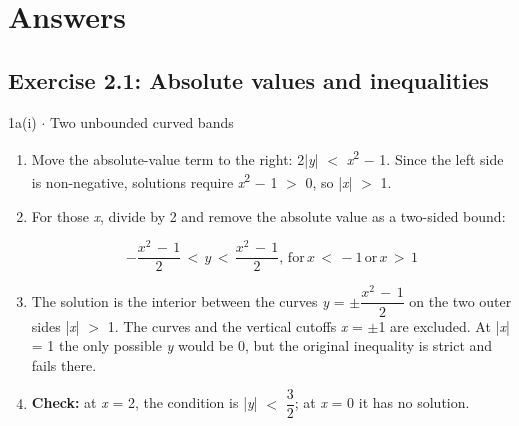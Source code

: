 \documentclass[11pt]{article}
\begin{document}
\clearpage
\section{Answers}
\begin{keepsection}\subsection{Exercise 2.1: Absolute values and inequalities}

\begin{workedbox}{1a(i) \ensuremath{\cdot} Two unbounded curved bands}
\begin{enumerate}
\item Move the absolute-value term to the right: 2|\textit{y}| \ensuremath{<} \textit{x}\textsuperscript{2} \ensuremath{-} 1. Since the left side is non-negative, solutions require \textit{x}\textsuperscript{2} \ensuremath{-} 1 \ensuremath{>} 0, so |\textit{x}| \ensuremath{>} 1.
\item {}
For those \textit{x}, divide by 2 and remove the absolute value as a two-sided bound:

\begin{equation*}-\dfrac{{x}^{2}\, -\, 1}{2}\, <\, {y}\, <\, \dfrac{{x}^{2}\, -\, 1}{2},\, \text{for}\, {x}\, <\, -1\, \text{or}\, {x}\, >\, 1\end{equation*}
\item The solution is the interior between the curves \textit{y} = \ensuremath{\pm}{\small\ensuremath{\dfrac{{x}^{2}\, -\, 1}{2}}} on the two outer sides |\textit{x}| \ensuremath{>} 1. The curves and the vertical cutoffs \textit{x} = \ensuremath{\pm}1 are excluded. At |\textit{x}| = 1 the only possible \textit{y} would be 0, but the original inequality is strict and fails there.
\item {}
\textbf{Check:} at \textit{x} = 2, the condition is |\textit{y}| \ensuremath{<} {\small\ensuremath{\dfrac{3}{2}}}; at \textit{x} = 0 it has no solution.


\end{enumerate}
\end{workedbox}
\end{keepsection}
\end{document}
